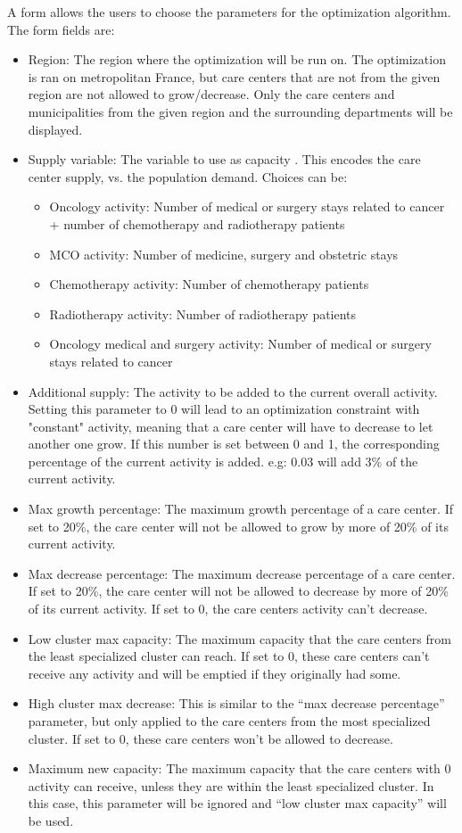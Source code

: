 A form allows the users to choose the parameters for the optimization algorithm.
The form fields are:

\begin{itemize}
    \item Region: The region where the optimization will be run on. The optimization is ran on metropolitan France, but care centers that are not from the given region are not allowed to grow/decrease. Only the care centers and municipalities from the given region and the surrounding departments will be displayed.
    \item Supply variable: The variable to use as capacity . This encodes the care center supply, vs. the population demand. Choices can be:
    \begin{itemize}
        \item Oncology activity: Number of medical or surgery stays related to cancer + number of chemotherapy and radiotherapy patients
        \item MCO activity: Number of medicine, surgery and obstetric stays
        \item Chemotherapy activity: Number of chemotherapy patients
        \item Radiotherapy activity: Number of radiotherapy patients
        \item Oncology medical and surgery activity: Number of medical or surgery stays related to cancer
    \end{itemize}
    \item Additional supply: The activity to be added to the current overall activity. Setting this parameter to 0 will lead to an optimization constraint with "constant" activity, meaning that a care center will have to decrease to let another one grow. If this number is set between 0 and 1, the corresponding percentage of the current activity is added. e.g: 0.03 will add 3\% of the current activity.
    \item Max growth percentage: The maximum growth percentage of a care center. If set to 20\%, the care center will not be allowed to grow by more of 20\% of its current activity.
    \item Max decrease percentage: The maximum decrease percentage of a care center. If set to 20\%, the care center will not be allowed to decrease by more of 20\% of its current activity. If set to 0, the care centers activity can't decrease.
    \item Low cluster max capacity: The maximum capacity that the care centers from the least specialized cluster can reach. If set to 0, these care centers can't receive any activity and will be emptied if they originally had some.
    \item High cluster max decrease: This is similar to the ``max decrease percentage'' parameter, but only applied to the care centers from the most specialized cluster. If set to 0, these care centers won't be allowed to decrease.
    \item Maximum new capacity: The maximum capacity that the care centers with 0 activity can receive, unless they are within the least specialized cluster. In this case, this parameter will be ignored and ``low cluster max capacity'' will be used.
\end{itemize}

